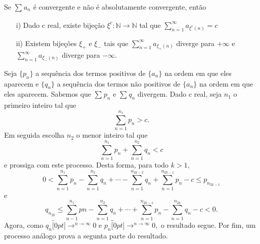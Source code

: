 \documentclass[analysis_notes.tex]{subfiles}
\begin{document}
\begin{theorem*}
	Se $\sum\limits_{}^{}a_{n}$ \'e convergente e n\~ao \'e absolutamente convergente, ent\~ao
	\begin{itemize}
		\item[i)] Dado c real, existe bije\c c\~ao $\xi^{c}:\mathbb{N}\rightarrow \mathbb{N}$ tal que $\sum\limits_{n=1}^{\infty}a_{\xi^{c}(n)} = c$
		\item[ii)] Existem bije\c c\~oes $\xi_{+}$ e $\xi_{-}$ tais que $\sum_{n=1}^{\infty}a_{\xi_{+}(n)}$ diverge para $+\infty$
		      e $\sum\limits_{n=1}^{\infty}a_{\xi_{-}(n)}$ diverge para $-\infty.$
	\end{itemize}
\end{theorem*}
\begin{proof*}
	Seja $\{p_{n}\}$ a sequ\^encia dos termos positivos de $\{a_{n}\}$ na ordem em que eles aparecem e $\{q_{n}\}$ a sequ\^encia dos termos
	n\~ao positivos de $\{a_{n}\}$ na ordem em que eles aparecem. Sabemos que $\sum\limits_{}^{}p_{n}$ e $\sum\limits_{}^{}q_{n}$ divergem.
	Dado c real, seja $n_{1}$ o primeiro inteiro tal que
	$$
		\sum\limits_{n=1}^{n_{1}}p_{n} > c.
	$$
	Em seguida escolha $n_{2}$ o menor inteiro tal que
	$$
		\sum\limits_{n=1}^{n_{1}}p_{n} + \sum\limits_{n=1}^{n_{2}}q_{n} < c
	$$
	e prossiga com este processo. Desta forma, para todo $k > 1,$
	$$
		0 < \sum\limits_{n=1}^{n_{1}}p_{n} - \sum\limits_{n=1}^{n_{2}}q_{n} + \cdots - \sum\limits_{n=1}^{n_{2k-2}}q_{n} + \sum\limits_{n=1}^{n_{2k-1}}p_{n} - c \leq{p_{n_{2k-1}}}
	$$
	e
	$$
		q_{n_{2k}}\leq{\sum\limits_{n-1}^{n_{1}}pn} - \sum\limits_{n=1}^{n_{2}}q_{n} + \cdots + \sum\limits_{n=1}^{n_{2k-1}}p_{n} - \sum\limits_{n=1}^{n_{2k}}q_{n} - c < 0.
	$$
	Agora, como $q_{n}\overbracket[0pt]{\longrightarrow}^{n\to \infty}0$ e $p_{n}\overbracket[0pt]{\longrightarrow}^{n\to \infty}0,$ o resultado segue.
	Por fim, um processo an\'alogo prova a segunta parte do resultado. \qedsymbol
\end{proof*}
\end{document}
